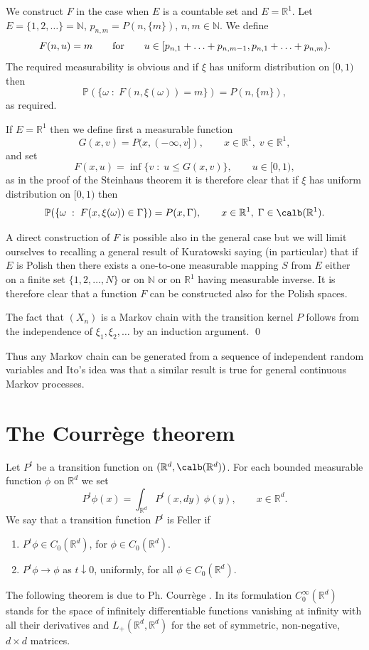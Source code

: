 \documentclass[preprint]{imsart}
\def\P{\mathbb P}
\def\N{\mathbb N}
\def\R{\mathbb R}
\begin{document}
{ We construct $F$ in the case when $E$ is a
countable set and $E=\R^1$. Let $E=\{1,2,\ldots\}=\N$,
$p_{n,m}=P(n,\{m\})$, $n,m\in\N$. We define
$$
F(n,u)= m\qquad {\rm for}\qquad
u\in [p_{n,1}+\ldots+p_{n,m-1}, p_{n,1}+\ldots+p_{n,m}).
$$
The required measurability is obvious and if $\xi$ has uniform
distribution on $[0,1)$ then
$$
\P(\{\omega\; :\; F(n,\xi(\omega))=m\})= P(n,\{m\}),
$$
as required.

If $E=\R^1$ then we define first a measurable function
$$
G(x,v)  =P(x,(-\infty,v]),
\qquad x\in\R^1,\; v\in\R^1,
$$
and set
$$
F(x,u)= \inf\{v\; :\; u\le G(x,v)\},
\qquad u\in [0,1),
$$
as in the proof of the Steinhaus theorem it is therefore clear
that if $\xi$ has uniform distribution on $[0,1)$ then
\begin{equation}\label{verifsufdue}
\P(\{\omega\; :\; F(x,\xi(\omega))\in\Gamma\})= P(x,\Gamma),
\qquad x\in\R^1,\; \Gamma \in \calb(\R^1).
\end{equation}

A direct construction of $F$ is possible also in the general case
but we will limit ourselves to recalling a general result of
Kuratowski saying (in particular) that if $E$ is Polish then there
exists a one-to-one measurable mapping $S$ from $E$ either on a
finite set $\{ 1,2,\ldots, N\}$ or on $\N$ or on $\R^1$ having
measurable inverse. It is therefore clear that a function $F$ can
be constructed also for the  Polish spaces.

The fact that $(X_n)$
is a Markov chain with the transition kernel $P$ follows from the
independence of $\xi_1,\xi_2,\ldots$ by an induction argument.
\qed

Thus any Markov chain can be generated from a sequence of
independent random variables and Ito's idea was that a similar
result is true for general continuous Markov processes.



\section{The Courr\`ege theorem}

Let  $P^t$ be a transition function on
$(\R^d, \calb(\R^d))$. For each bounded measurable function
$\phi$ on $\R^d$ we set
$$
P^t\phi(x)= \int_{\R^d} P^t(x,dy)\, \phi(y),
\qquad x\in \R^d.
$$
We say that a transition function $P^t$ is Feller if
\begin{enumerate}
\item[1)]
$P^t\phi\in C_0(\R^d)$, for $\phi\in C_0(\R^d)$.
\item[2)] $ P^t\phi\to\phi$ as $t\downarrow 0$, uniformly,
for all $\phi\in C_0(\R^d)$.
\end{enumerate}
The following theorem is due to
Ph. Courr\`ege \cite{curr}. In its formulation
$C_0^\infty (\R^d)$ stands for the
space of infinitely differentiable functions
vanishing at infinity with
all their derivatives
and
$ L_+(\R^d,\R^d)$  for the set of
symmetric, non-negative, $d \times d$
matrices.


}
\end{document}
